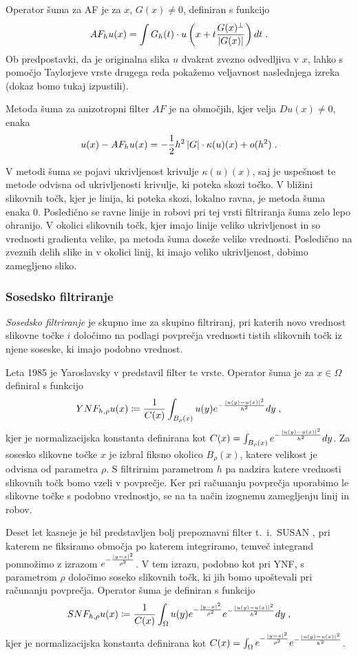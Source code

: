 Operator šuma za AF je za $x$, $G(x) \neq 0$, definiran s funkcijo
%
$$AF_h u(x) = \int G_h(t)\cdot u\left( x + t \frac{G(x)^\perp}{\left|G(x)\right|}\right) dt\;.$$
%
Ob predpostavki, da je originalna slika $u$ dvakrat zvezno odvedljiva v $x$, lahko s pomočjo Taylorjeve vrste drugega reda pokažemo veljavnost naslednjega izreka (dokaz bomo tukaj izpustili).
%
\begin{izrek}
Metoda šuma za anizotropni filter $AF$ je na območjih, kjer velja $Du(x) \neq 0$, enaka
$$u(x) - AF_h u(x) = - \frac{1}{2} h^2 \left|G\right|\cdot \kappa (u)(x) + o(h^2)\;.$$
\end{izrek}
%
V metodi šuma se pojavi ukrivljenost krivulje $\kappa (u)(x)$, saj je uspešnost te metode odvisna od ukrivljenosti krivulje, ki poteka skozi točko. V bližini slikovnih točk, kjer je linija, ki poteka skozi, lokalno ravna, je metoda šuma enaka 0. Posledično se ravne linije in robovi pri tej vrsti filtriranja šuma zelo lepo ohranijo. V okolici slikovnih točk, kjer imajo linije veliko ukrivljenost in so vrednosti gradienta velike, pa metoda šuma doseže velike vrednosti. Posledično na zveznih delih slike in v okolici linij, ki imajo veliko ukrivljenost, dobimo zamegljeno sliko.
\subsubsection{Sosedsko filtriranje}
\emph{Sosedsko filtriranje} je skupno ime za skupino filtriranj, pri katerih novo vrednost slikovne točke $i$ določimo na podlagi povprečja vrednosti tistih slikovnih točk iz njene soseske, ki imajo podobno vrednost. 

Leta 1985 je Yaroslavsky v \cite{Yaro:Digital} predstavil filter te vrste. Operator šuma je za $x \in \Omega$ definiral s funkcijo
%
$$YNF_{h, \rho} u(x) \coloneqq \frac{1}{C(x)} \int_{B_{\rho}(x)} u(y) e^{- \frac{\left|u(y) - u(x)\right|^2}{h^2}} dy\;,$$
%
kjer je normalizacijska konstanta definirana kot $C(x) = \int_{B_{\rho}(x)} e^{-\frac{\left|u(y) - u(x)\right|^2}{h^2}} dy$.
Za sosesko slikovne točke $x$ je izbral fiksno okolico $B_{\rho}(x)$, katere velikost je odvisna od parametra $\rho$. S filtrirnim parametrom $h$ pa nadzira katere vrednosti slikovnih točk bomo vzeli v povprečje. Ker pri računanju povprečja uporabimo le slikovne točke s podobno vrednostjo, se na ta način izognemu zamegljenju linij in robov.

Deset let kasneje je bil predstavljen bolj prepoznavni filter t.~i.\ SUSAN \cite{Susan:Filter}, pri katerem ne fiksiramo območja po katerem integriramo, temveč integrand pomnožimo z izrazom $e^{-\frac{\left|y - x\right|^2}{\rho^2}}$. V tem izrazu, podobno kot pri YNF, s parametrom $\rho$ določimo soseko slikovnih točk, ki jih bomo upoštevali pri računanju povprečja. Operator šuma je definiran s funkcijo
%
$$SNF_{h, \rho} u(x) \coloneqq \frac{1}{C(x)} \int_{\Omega} u(y) e^{-\frac{\left|y - x\right|^2}{\rho^2}} e^{- \frac{\left|u(y) - u(x)\right|^2}{h^2}} dy\;,$$
%
kjer je normalizacijska konstanta definirana kot $C(x) = \int_{\Omega} e^{- \frac{\left|y - x\right|^2}{\rho^2}} e^{- \frac{\left|u(y) - u(x)\right|^2}{h^2}}$.

